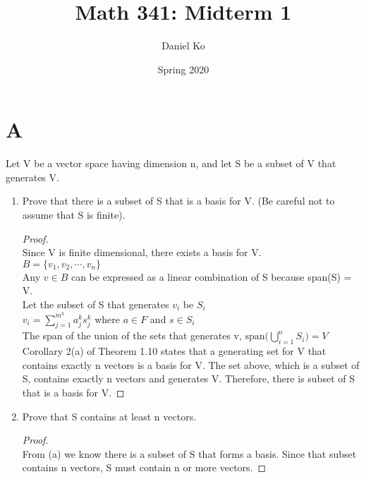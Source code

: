 \documentclass[11pt]{scrartcl}
\title{Math 341: Midterm 1}
\author{Daniel Ko}
\date{Spring 2020}
\begin{document}
\maketitle

\section{A}
Let V be a vector space having dimension n, and let S be a subset of V that generates V.

\begin{enumerate}[label=\alph*.]
	\item{
			Prove that there is a subset of S that is a basis for V. (Be careful not to assume that S is finite).
			\begin{proof}
			\-\\
			Since V is finite dimensional, there exists a basis for V.\\
			$B = \{v_1, v_2, \cdots, v_n\}$\\
			Any $v \in B$ can be expressed as a linear combination of S because span(S) = V.\\
			Let the subset of S that generates $v_i$ be $S_i$\\
			$v_i = \sum_{j=1}^{m^k} a_j^k s_j^k$ where $a\in F$ and $s \in S_i$\\
			The span of the union of the sets that generates v, $\text{span(} \bigcup_{i=1}^{n}S_i \text{)} = V$\\ 
			Corollary 2(a) of Theorem 1.10 states that a generating set for V that contains exactly n vectors is a basis for V.
			The set above, which is a subset of S, contains exactly n vectors and generates V. Therefore, there is subset of S that is a basis for V. 
			\end{proof}

	}
	\item{
			Prove that S contains at least n vectors.
			\begin{proof}
			\-\\
			From (a) we know there is a subset of S that forms a basis. Since that subset contains n vectors, S must contain n or more vectors. 
			\end{proof}
		}
\end{enumerate}
\end{document}
